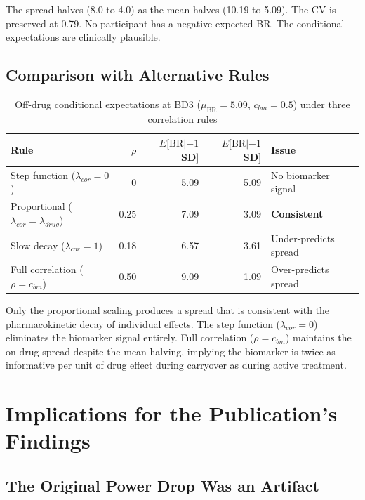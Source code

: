 \documentclass[11pt]{article}
\begin{document}
The spread halves (8.0 to 4.0) as the mean halves (10.19 to
5.09). The CV is preserved at 0.79. No participant has a
negative expected BR. The conditional expectations are
clinically plausible.

\subsection{Comparison with Alternative Rules}

\begin{table}[h]
\centering
\caption{Off-drug conditional expectations at BD3
  ($\mu_{\text{BR}} = 5.09$, $c_{bm} = 0.5$) under
  three correlation rules}
\begin{tabular}{lrrrl}
\toprule
Rule & $\rho$ & $E[\text{BR}|+1$SD$]$ &
  $E[\text{BR}|-1$SD$]$ & Issue \\
\midrule
Step function ($\lambda_{cor} = 0$) & 0 & 5.09 & 5.09 &
  No biomarker signal \\
Proportional ($\lambda_{cor} = \lambda_{drug}$) & 0.25 &
  7.09 & 3.09 & \textbf{Consistent} \\
Slow decay ($\lambda_{cor} = 1$) & 0.18 & 6.57 & 3.61 &
  Under-predicts spread \\
Full correlation ($\rho = c_{bm}$) & 0.50 & 9.09 & 1.09 &
  Over-predicts spread \\
\bottomrule
\end{tabular}
\end{table}

Only the proportional scaling produces a spread that is
consistent with the pharmacokinetic decay of individual
effects. The step function ($\lambda_{cor} = 0$) eliminates
the biomarker signal entirely. Full correlation
($\rho = c_{bm}$) maintains the on-drug spread despite the
mean halving, implying the biomarker is twice as informative
per unit of drug effect during carryover as during active
treatment.

\section{Implications for the Publication's Findings}

\subsection{The Original Power Drop Was an Artifact}
\end{document}
